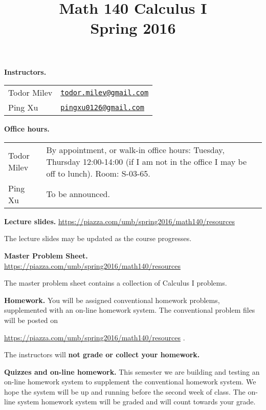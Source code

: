 \documentclass{article}
\title{\vskip -2cm 
 Math 140 Calculus I \\ Spring 2016}
\date{}
\newcommand{\websitebase}{https://piazza.com/umb/spring2016/math140}
\begin{document}
\maketitle


\noindent \textbf{Instructors.} 
\begin{tabular}{ll}
Todor Milev & \href{mailto:todor.milev@gmail.com}{\nolinkurl{todor.milev@gmail.com}} \\
Ping Xu & \href{mailto:pingxu0126@gmail.com}{\nolinkurl{pingxu0126@gmail.com}} 
\end{tabular}

\medskip
\noindent \textbf{Office hours. } \begin{tabular}{lp{12cm}}
Todor Milev & By appointment, or walk-in office hours: Tuesday, Thursday 12:00-14:00 (if I am not in the office I may be off to lunch).  Room: S-03-65.\\
Ping Xu&  To be announced.
\end{tabular}





\medskip \noindent \textbf{Lecture slides. }  \url{\websitebase/resources}

\medskip\noindent The lecture slides may be updated as the course progresses.


\medskip \noindent \textbf{Master Problem Sheet. }  \url{\websitebase/resources} 

\medskip\noindent The master problem sheet contains a collection of Calculus I problems. 

\medskip
\noindent \textbf{Homework.} You will be assigned conventional homework problems, supplemented with an on-line homework system. The conventional problem files will be posted on

\url{\websitebase/resources} \quad \quad \quad .

\noindent  The instructors will \textbf{not grade or collect your homework.} 


\medskip
\noindent \textbf{Quizzes and on-line homework.} This semester we are building and testing an on-line homework system to supplement the conventional homework system. We hope the system will be up and running before the second week of class. The on-line system homework system will be graded and will count towards your grade. 
\end{document}
